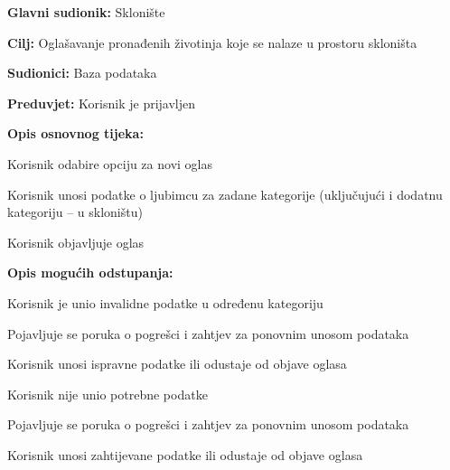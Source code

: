 					\noindent {}
					\begin{packed_item}
						
						\item \textbf{Glavni sudionik: }Sklonište
						\item  \textbf{Cilj:} Oglašavanje pronađenih životinja koje se nalaze u prostoru skloništa
						\item  \textbf{Sudionici:} Baza podataka
						\item  \textbf{Preduvjet:} Korisnik je prijavljen
						\item  \textbf{Opis osnovnog tijeka:}
						
						\item[] \begin{packed_enum}
							
							\item Korisnik odabire opciju za novi oglas
							\item Korisnik unosi podatke o ljubimcu za zadane kategorije (uključujući i dodatnu kategoriju – u skloništu)
							\item Korisnik objavljuje oglas
						\end{packed_enum}
						
						\item  \textbf{Opis mogućih odstupanja:}
						
						\item[] \begin{packed_item}
							
							\item[2.a] Korisnik je unio invalidne podatke u određenu kategoriju
							\item[] \begin{packed_enum}
								
								\item Pojavljuje se poruka o pogrešci i zahtjev za ponovnim unosom podataka
								\item Korisnik unosi ispravne podatke ili odustaje od objave oglasa
								
							\end{packed_enum}
							\item[2.b] Korisnik nije unio potrebne podatke
							\item[] \begin{packed_enum}
								
								\item Pojavljuje se poruka o pogrešci i zahtjev za ponovnim unosom podataka
								\item Korisnik unosi zahtijevane podatke ili odustaje od objave oglasa
								
							\end{packed_enum}
						\end{packed_item}
					\end{packed_item}
					
